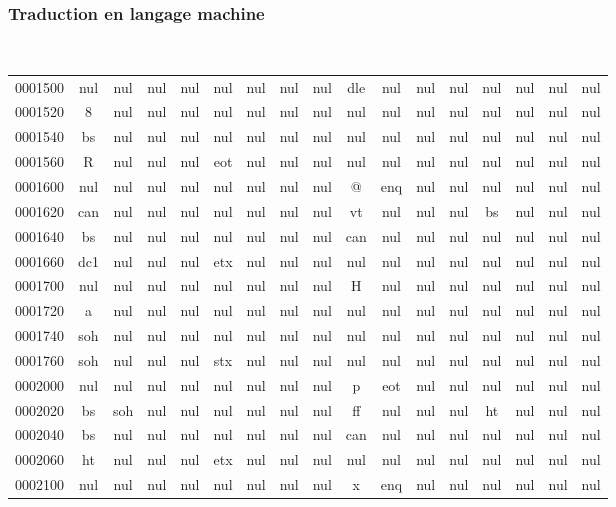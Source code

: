 \begin{frame}[fragile]
\frametitle{Traduction en langage machine}
{\tt \footnotesize
\setlength{\tabcolsep}{.07cm}
\begin{tabular}{ccccccccccccccccc}
0001500 &nul &nul &nul &nul &nul &nul &nul &nul &dle &nul &nul &nul &nul &nul &nul &nul \\
0001520 &8 &nul &nul &nul &nul &nul &nul &nul &nul &nul &nul &nul &nul &nul &nul &nul \\
0001540 &bs &nul &nul &nul &nul &nul &nul &nul &nul &nul &nul &nul &nul &nul &nul &nul \\
0001560 &R &nul &nul &nul &eot &nul &nul &nul &nul &nul &nul &nul &nul &nul &nul &nul \\
0001600 &nul &nul &nul &nul &nul &nul &nul &nul &@ &enq &nul &nul &nul &nul &nul &nul \\
0001620 &can &nul &nul &nul &nul &nul &nul &nul &vt &nul &nul &nul &bs &nul &nul &nul \\
0001640 &bs &nul &nul &nul &nul &nul &nul &nul &can &nul &nul &nul &nul &nul &nul &nul \\
0001660 &dc1 &nul &nul &nul &etx &nul &nul &nul &nul &nul &nul &nul &nul &nul &nul &nul \\
0001700 &nul &nul &nul &nul &nul &nul &nul &nul &H &nul &nul &nul &nul &nul &nul &nul \\
0001720 &a &nul &nul &nul &nul &nul &nul &nul &nul &nul &nul &nul &nul &nul &nul &nul \\
0001740 &soh &nul &nul &nul &nul &nul &nul &nul &nul &nul &nul &nul &nul &nul &nul &nul \\
0001760 &soh &nul &nul &nul &stx &nul &nul &nul &nul &nul &nul &nul &nul &nul &nul &nul \\
0002000 &nul &nul &nul &nul &nul &nul &nul &nul &p &eot &nul &nul &nul &nul &nul &nul \\
0002020 &bs &soh &nul &nul &nul &nul &nul &nul &ff &nul &nul &nul &ht &nul &nul &nul \\
0002040 &bs &nul &nul &nul &nul &nul &nul &nul &can &nul &nul &nul &nul &nul &nul &nul \\
0002060 &ht &nul &nul &nul &etx &nul &nul &nul &nul &nul &nul &nul &nul &nul &nul &nul \\
0002100 &nul &nul &nul &nul &nul &nul &nul &nul &x &enq &nul &nul &nul &nul &nul &nul \\
\end{tabular}}
\end{frame}

